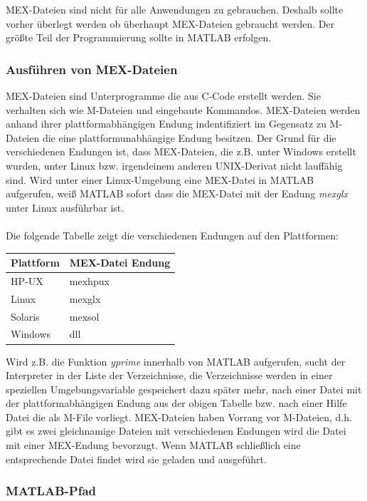 \documentclass[a4paper,11pt]{article}
\begin{document}
MEX-Dateien sind nicht für alle Anwendungen zu gebrauchen. Deshalb
sollte vorher überlegt werden ob überhaupt MEX-Dateien gebraucht
werden. Der größte Teil der Programmierung sollte in MATLAB erfolgen.

\subsubsection*{Ausführen von MEX-Dateien}
MEX-Dateien sind Unterprogramme die aus C-Code erstellt werden. Sie
verhalten sich wie M-Dateien und eingebaute Kommandos. MEX-Dateien
werden anhand ihrer plattformabhängigen Endung indentifiziert im
Gegensatz zu M-Dateien die eine plattformunabhängige Endung besitzen. 
Der Grund für die verschiedenen Endungen ist, dass
MEX-Dateien, die z.B. unter Windows erstellt wurden, unter Linux bzw.
irgendeinem anderen UNIX-Derivat nicht lauffähig sind. Wird unter
einer Linux-Umgebung eine MEX-Datei in MATLAB aufgerufen, weiß
MATLAB sofort dass die MEX-Datei mit der Endung \textit{mexglx}
unter Linux ausführbar ist.\\\\
Die folgende Tabelle zeigt die verschiedenen Endungen auf den
Plattformen:
\begin{center}
\begin{tabular}{|l|l|}
\hline
\textbf{Plattform} & \textbf{MEX-Datei Endung}\\
\hline
HP-UX & mexhpux\\
\hline
Linux & mexglx\\
\hline
Solaris & mexsol\\
\hline
Windows & dll\\
\hline
\end{tabular}
\end{center}
Wird z.B. die Funktion \textit{yprime} innerhalb von MATLAB aufgerufen, sucht
der Interpreter in der Liste der Verzeichnisse, die Verzeichnisse werden in
einer speziellen Umgebungsvariable gespeichert dazu später mehr, nach einer
Datei mit der plattformabhängigen Endung aus der obigen Tabelle bzw. nach einer 
Hilfe Datei die als M-File vorliegt. MEX-Dateien haben Vorrang vor M-Dateien,
d.h. gibt es zwei gleichnamige Dateien mit verschiedenen Endungen wird die
Datei mit einer MEX-Endung bevorzugt. Wenn MATLAB schließlich eine
entsprechende Datei findet wird sie geladen und ausgeführt.

\subsubsection*{MATLAB-Pfad}
\end{document}
